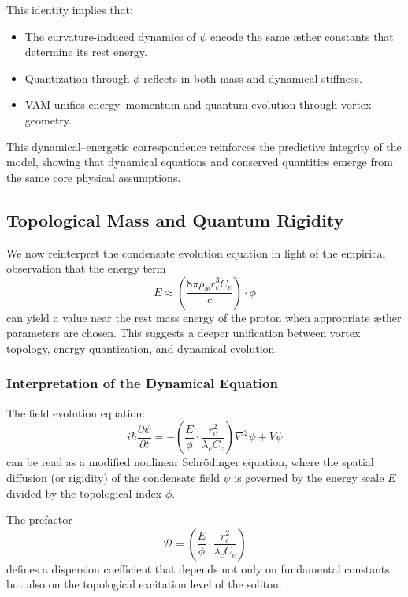             This identity implies that:
            \begin{itemize}
              \item The curvature-induced dynamics of $\psi$ encode the same æther constants that determine its rest energy.
              \item Quantization through $\phi$ reflects in both mass and dynamical stiffness.
              \item VAM unifies energy–momentum and quantum evolution through vortex geometry.
            \end{itemize}

            This dynamical–energetic correspondence reinforces the predictive integrity of the model, showing that dynamical equations and conserved quantities emerge from the same core physical assumptions.
            \subsection{Topological Mass and Quantum Rigidity}

            We now reinterpret the condensate evolution equation in light of the empirical observation that the energy term
            \[
            E \approx \left( \frac{8\pi \rho_{\text{æ}} r_c^3 C_e}{c} \right) \cdot \phi
            \]
            can yield a value near the rest mass energy of the proton when appropriate æther parameters are chosen. This suggests a deeper unification between vortex topology, energy quantization, and dynamical evolution.

            \subsubsection{Interpretation of the Dynamical Equation}

            The field evolution equation:
            \begin{equation}
            i\hbar \frac{\partial \psi}{\partial t}
            = - \left( \frac{E}{\phi} \cdot \frac{r_c^2}{\lambda_c C_e} \right) \nabla^2 \psi + V \psi
            \end{equation}
            can be read as a modified nonlinear Schrödinger equation, where the spatial diffusion (or rigidity) of the condensate field $\psi$ is governed by the energy scale $E$ divided by the topological index $\phi$.

            The prefactor
            \[
            \mathcal{D} = \left( \frac{E}{\phi} \cdot \frac{r_c^2}{\lambda_c C_e} \right)
            \]
            defines a dispersion coefficient that depends not only on fundamental constants but also on the topological excitation level of the soliton.

